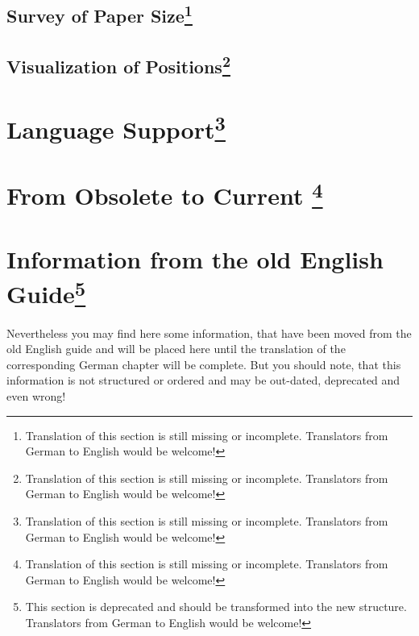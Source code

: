 \mbox{}%

\subsection{Survey of Paper Size\protect\footnote{Translation of
    this section is still missing or incomplete. Translators from German to
    English would be welcome!}}
\label{sec:scrlttr2-experts.papersize}

\mbox{}%

\subsection{Visualization of Positions\protect\footnote{Translation of
    this section is still missing or incomplete. Translators from German to
    English would be welcome!}}
\label{sec:scrlttr2-experts.visualize}

\mbox{}%

\section{Language Support\protect\footnote{Translation of
    this section is still missing or incomplete. Translators from German to
    English would be welcome!}}
\label{sec:scrlttr2-experts.languages}%

\mbox{}%

\section{From Obsolete  to Current
  \protect\footnote{Translation of this section is still
    missing or incomplete. Translators from German to English would be
    welcome!}}
\label{sec:scrlttr2-experts.fromscrlettr}

\mbox{}%


\section{Information from the old English Guide\protect\footnote{This
    section is deprecated and should be transformed into the new
    structure. Translators from German to English would be welcome!}}

Nevertheless you may find here some information, that have been moved from the
old English guide and will be placed here until the translation of the
corresponding German chapter will be complete. But you should note, that this
information is not structured or ordered and may be out-dated, deprecated and
even wrong!

